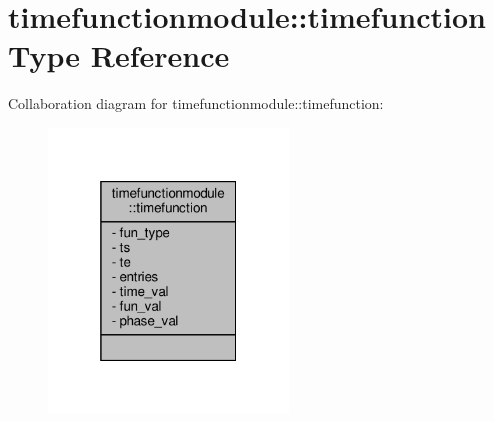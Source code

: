 \hypertarget{structtimefunctionmodule_1_1timefunction}{}\section{timefunctionmodule\+:\+:timefunction Type Reference}
\label{structtimefunctionmodule_1_1timefunction}


Collaboration diagram for timefunctionmodule\+:\+:timefunction\+:\nopagebreak
\begin{figure}[H]
\begin{center}
\leavevmode
\includegraphics[width=181pt]{structtimefunctionmodule_1_1timefunction__coll__graph}
\end{center}
\end{figure}
